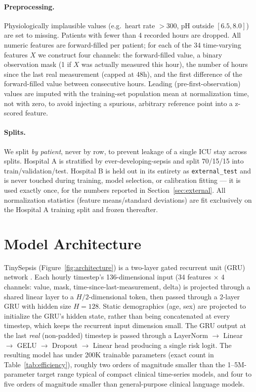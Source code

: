 \documentclass[11pt]{article}
\begin{document}
\paragraph{Preprocessing.} Physiologically implausible values (e.g.\ heart rate $>300$, pH outside $[6.5, 8.0]$) are set to missing. Patients with fewer than 4 recorded hours are dropped. All numeric features are forward-filled per patient; for each of the 34 time-varying features $X$ we construct four channels: the forward-filled value, a binary observation mask (1 if $X$ was actually measured this hour), the number of hours since the last real measurement (capped at 48h), and the first difference of the forward-filled value between consecutive hours. Leading (pre-first-observation) values are imputed with the training-set population mean at normalization time, not with zero, to avoid injecting a spurious, arbitrary reference point into a z-scored feature.

\paragraph{Splits.} We split \emph{by patient}, never by row, to prevent leakage of a single ICU stay across splits. Hospital A is stratified by ever-developing-sepsis and split 70/15/15 into train/validation/test. Hospital B is held out in its entirety as \texttt{external\_test} and is never touched during training, model selection, or calibration fitting --- it is used exactly once, for the numbers reported in Section~\ref{sec:external}. All normalization statistics (feature means/standard deviations) are fit exclusively on the Hospital A training split and frozen thereafter.

\section{Model Architecture}
\label{sec:model}

TinySepsis (Figure~\ref{fig:architecture}) is a two-layer gated recurrent unit (GRU) network \citep{cho2014gru}. Each hourly timestep's 136-dimensional input (34 features $\times$ 4 channels: value, mask, time-since-last-measurement, delta) is projected through a shared linear layer to a $H/2$-dimensional token, then passed through a 2-layer GRU with hidden size $H=128$. Static demographics (age, sex) are projected to initialize the GRU's hidden state, rather than being concatenated at every timestep, which keeps the recurrent input dimension small. The GRU output at the last \emph{real} (non-padded) timestep is passed through a LayerNorm $\to$ Linear $\to$ GELU $\to$ Dropout $\to$ Linear head producing a single risk logit. The resulting model has under 200K trainable parameters (exact count in Table~\ref{tab:efficiency}), roughly two orders of magnitude smaller than the 1--5M-parameter target range typical of compact clinical time-series models, and four to five orders of magnitude smaller than general-purpose clinical language models.
\end{document}
